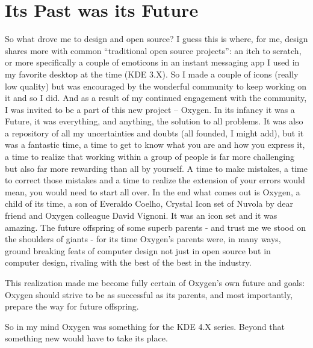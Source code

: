 \section*{Its Past was its Future}
So what drove me to design and open source? 
I guess this is where, for me, design shares more with common “traditional open source projects”: an itch to scratch, or more specifically a couple of emoticons in an instant messaging app I used in my favorite desktop at the time (KDE 3.X). So I made a couple of icons (really low quality) but was encouraged by the wonderful community to keep working on it and so I did. And as a result of my continued engagement with the community, I was invited to be a part of this new project – Oxygen. In its infancy it was a Future, it was everything, and anything, the solution to all problems. It was also a repository of all my uncertainties and doubts (all founded, I might add), but it was a fantastic time, a time to get to know what you are and how you express it, a time to realize that working within a group of people is far more challenging but also far more rewarding than all by yourself. A time to make mistakes, a time to correct those mistakes and a time to realize the extension of your errors would mean, you would need to start all over.
In the end what comes out is Oxygen, a child of its time, a son of Everaldo Coelho, Crystal Icon set of Nuvola by dear friend and Oxygen colleague David Vignoni. It was an icon set and it was amazing.
The future offspring of some superb parents - and trust me we stood on the shoulders of giants - for its time Oxygen's parents were, in many ways, ground breaking feats of computer design not just in open source but in computer design, rivaling with the best of the best in the industry.

This realization made me become fully certain of Oxygen's own future and goals: Oxygen should strive to be as successful as its parents, and most importantly, prepare the way for future offspring.

So in my mind Oxygen was something for the KDE 4.X series. Beyond that something new would have to take its place.  


